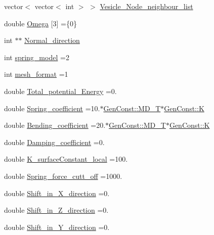 \begin{DoxyCompactItemize}
vector$<$ vector$<$ int $>$ $>$ \mbox{\hyperlink{classMembrane_a7ce2c0484a3943de93d299137d709738}{Vesicle\+\_\+\+Node\+\_\+neighbour\+\_\+list}}
\item 
double \mbox{\hyperlink{classMembrane_abc3f1639514283fbcc287038ff30586e}{Omega}} \mbox{[}3\mbox{]} =\{0\}
\item 
int $\ast$$\ast$ \mbox{\hyperlink{classMembrane_aacb12cbcff4d9068cc3ec4edc1525fbd}{Normal\+\_\+direction}}
\item 
int \mbox{\hyperlink{classMembrane_abda57a1da212a2a1fc36e0faa5e6baf4}{spring\+\_\+model}} =2
\item 
int \mbox{\hyperlink{classMembrane_aa70c224c9cef71bbaa49f4c0f5a9506a}{mesh\+\_\+format}} =1
\item 
double \mbox{\hyperlink{classMembrane_a44386c31326522dc000f7d88edde2c4b}{Total\+\_\+potential\+\_\+\+Energy}} =0.
\item 
double \mbox{\hyperlink{classMembrane_a51536477e359a874919d08dc7a97c7fa}{Spring\+\_\+coefficient}} =10.$\ast$\mbox{\hyperlink{namespaceGenConst_ae4fd28941bbc23f551687bc507c5bde7}{Gen\+Const\+::\+M\+D\+\_\+T}}$\ast$\mbox{\hyperlink{namespaceGenConst_a80679742796064a242391cd8e3c067d0}{Gen\+Const\+::K}}
\item 
double \mbox{\hyperlink{classMembrane_a25001dd440e0d8631a7191b3750f4188}{Bending\+\_\+coefficient}} =20.$\ast$\mbox{\hyperlink{namespaceGenConst_ae4fd28941bbc23f551687bc507c5bde7}{Gen\+Const\+::\+M\+D\+\_\+T}}$\ast$\mbox{\hyperlink{namespaceGenConst_a80679742796064a242391cd8e3c067d0}{Gen\+Const\+::K}}
\item 
double \mbox{\hyperlink{classMembrane_a673f0965635a8b716ffe7b1569550fe7}{Damping\+\_\+coefficient}} =0.
\item 
double \mbox{\hyperlink{classMembrane_a9d4d4fc012f1c7cec680d64c1b287726}{K\+\_\+surface\+Constant\+\_\+local}} =100.
\item 
double \mbox{\hyperlink{classMembrane_aa83ec44fdb8de36286e6f4b35af460f3}{Spring\+\_\+force\+\_\+cutt\+\_\+off}} =1000.
\item 
double \mbox{\hyperlink{classMembrane_a3c9d4f24bc0e38e0a18aeb771e3d4386}{Shift\+\_\+in\+\_\+\+X\+\_\+direction}} =0.
\item 
double \mbox{\hyperlink{classMembrane_a2fa88fd7d9832ef58e63b10208a7ccae}{Shift\+\_\+in\+\_\+\+Z\+\_\+direction}} =0.
\item 
double \mbox{\hyperlink{classMembrane_a73b22fb2ebda65accee05510303249ae}{Shift\+\_\+in\+\_\+\+Y\+\_\+direction}} =0.
\item 
$$
\end{DoxyCompactItemize}
